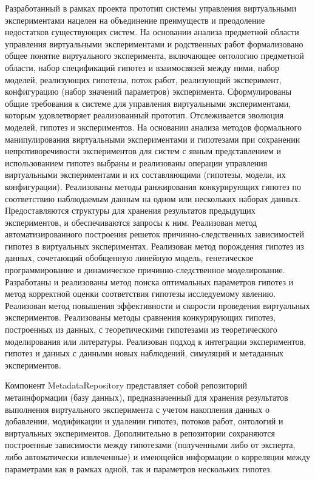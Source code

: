 Разработанный в рамках проекта прототип системы управления виртуальными экспериментами нацелен на объединение 
преимуществ и преодоление недостатков существующих систем. На основании анализа предметной области управления 
виртуальными экспериментами и родственных работ формализовано общее понятие виртуального эксперимента, включающее 
онтологию предметной области, набор спецификаций гипотез и взаимосвязей между ними, набор моделей, реализующих 
гипотезы, поток работ, реализующий эксперимент, конфигурацию (набор значений параметров) эксперимента. Сформулированы 
общие требования к системе для управления виртуальными экспериментами, которым удовлетворяет реализованный прототип. 
Отслеживается эволюция моделей, гипотез и экспериментов. На основании анализа методов формального манипулирования 
виртуальными экспериментами и гипотезами при сохранении непротиворечивости экспериментов для систем с явным 
представлением и использованием гипотез выбраны и реализованы операции управления виртуальными экспериментами и 
их составляющими (гипотезы, модели, их конфигурации). Реализованы методы ранжирования конкурирующих гипотез по 
соответствию наблюдаемым данным на одном или нескольких наборах данных. Предоставляются структуры для хранения 
результатов предыдущих экспериментов, и обеспечиваются запросы к ним. Реализован метод автоматизированного построения 
решеток причинно-следственных зависимостей гипотез в виртуальных экспериментах. Реализован метод порождения гипотез 
из данных, сочетающий обобщенную линейную модель, генетическое программирование и динамическое причинно-следственное 
моделирование. Разработаны и реализованы метод поиска оптимальных параметров гипотез и метод корректной оценки 
соответствия гипотезы исследуемому явлению. Реализован метод повышения эффективности и скорости проведения виртуальных 
экспериментов. Реализованы методы сравнения конкурирующих гипотез, построенных из данных, с теоретическими гипотезами 
из теоретического моделирования или литературы. Реализован подход к интеграции экспериментов, гипотез и данных с 
данными новых наблюдений, симуляций и метаданных экспериментов.

Компонент MetadataRepository представляет собой репозиторий метаинформации (базу данных), предназначенный для хранения 
результатов выполнения виртуального эксперимента с учетом накопления данных о добавлении, модификации и удалении 
гипотез, потоков работ, онтологий и виртуальных экспериментов. Дополнительно в репозитории сохраняются построенные 
зависимости между гипотезами (полученными либо от эксперта, либо автоматически извлеченные) и имеющейся информации 
о корреляции между параметрами как в рамках одной, так и параметров нескольких гипотез.

